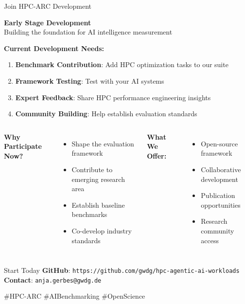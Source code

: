 \documentclass[compress,aspectratio=169]{beamer}
\begin{document}
\begin{frame}{Join HPC-ARC Development}

    \begin{center}
        \Large \textcolor{hpcblue}{\textbf{Early Stage Development}}\\
        \normalsize \textcolor{hpccyan}{Building the foundation for AI intelligence measurement}
    \end{center}

    \vspace{0.8em}
    \textbf{Current Development Needs:}
    \scriptsize
    \begin{enumerate}
        \item \textbf{Benchmark Contribution}: Add HPC optimization tasks to our suite
        \item \textbf{Framework Testing}: Test with your AI systems
        \item \textbf{Expert Feedback}: Share HPC performance engineering insights
        \item \textbf{Community Building}: Help establish evaluation standards
    \end{enumerate}

    \begin{columns}[t]
            \textbf{Why Participate Now?}
            \scriptsize
            \begin{itemize}
                \item Shape the evaluation framework
                \item Contribute to emerging research area
                \item Establish baseline benchmarks
                \item Co-develop industry standards
            \end{itemize}

            \textbf{What We Offer:}
            \scriptsize
            \begin{itemize}
                \item Open-source framework
                \item Collaborative development
                \item Publication opportunities
                \item Research community access
            \end{itemize}
    \end{columns}

    \vspace{0.8em}
    \begin{block}{Start Today}
        \centering
        \tiny
        \textbf{GitHub}: \texttt{https://github.com/gwdg/hpc-agentic-ai-workloads} $\quad$
        \textbf{Contact}: \texttt{anja.gerbes@gwdg.de}
    \end{block}

    \vspace{0.2em}
    \scriptsize \textcolor{hpcblue}{\#HPC-ARC \#AIBenchmarking \#OpenScience}
\end{frame}
\end{document}
